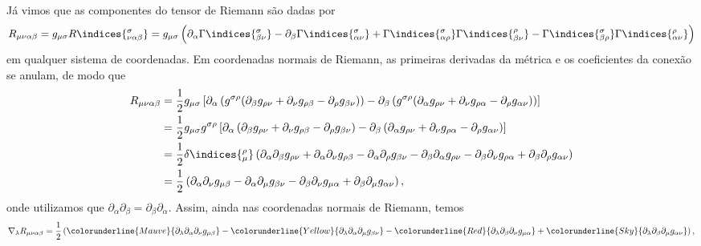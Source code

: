 Já vimos que as componentes do tensor de Riemann são dadas por
\begin{equation*}
    R_{\mu \nu \alpha \beta} = g_{\mu \sigma}R\indices{^\sigma_{\nu \alpha \beta}} = g_{\mu \sigma} \left( \partial_{\alpha}\Gamma\indices{^{\sigma}_{\beta\nu}}- \partial_{\beta}\Gamma\indices{^{\sigma}_{\alpha\nu}} + \Gamma\indices{^\sigma_{\alpha\rho}} \Gamma\indices{^\rho_{\beta\nu}} - \Gamma\indices{^\sigma_{\beta\rho}} \Gamma\indices{^\rho_{\alpha\nu}} \right)
\end{equation*}
em qualquer sistema de coordenadas. Em coordenadas normais de Riemann, as primeiras derivadas da métrica e os coeficientes da conexão se anulam, de modo que
\begin{align*}
    R_{\mu\nu \alpha \beta} &= \frac12g_{\mu \sigma} \left[ \partial_\alpha\left(g^{\sigma \rho}(\partial_\beta g_{\rho \nu} + \partial_\nu g_{\rho \beta} - \partial_{\rho} g_{\beta \nu} )\right) - \partial_\beta\left(g^{\sigma \rho}(\partial_\alpha g_{\rho \nu} + \partial_\nu g_{\rho \alpha} - \partial_{\rho} g_{\alpha \nu} )\right)\right]\\
                            &= \frac12g_{\mu \sigma} g^{\sigma \rho} \left[\partial_\alpha\left(\partial_\beta g_{\rho \nu} + \partial_\nu g_{\rho \beta} - \partial_{\rho} g_{\beta \nu}\right) - \partial_\beta\left(\partial_\alpha g_{\rho \nu} + \partial_\nu g_{\rho \alpha} - \partial_{\rho} g_{\alpha \nu}\right)\right]\\
                            &= \frac12 \delta\indices{^\rho_\mu} \left(\partial_\alpha\partial_\beta g_{\rho \nu} + \partial_\alpha\partial_\nu g_{\rho \beta} - \partial_\alpha\partial_{\rho} g_{\beta \nu} - \partial_\beta\partial_\alpha g_{\rho \nu} - \partial_\beta\partial_\nu g_{\rho \alpha} + \partial_\beta\partial_{\rho} g_{\alpha \nu}\right)\\
                            &= \frac12 \left(\partial_\alpha\partial_\nu g_{\mu \beta} - \partial_\alpha\partial_{\mu} g_{\beta \nu} - \partial_\beta\partial_\nu g_{\mu \alpha} + \partial_\beta\partial_{\mu} g_{\alpha \nu}\right),
\end{align*}
onde utilizamos que \(\partial_\alpha \partial_\beta = \partial_\beta \partial_\alpha\). Assim, ainda nas coordenadas normais de Riemann, temos
\begin{equation*}
    \nabla_{\lambda} R_{\mu\nu \alpha\beta} = \frac12 \left(\colorunderline{Mauve}{\partial_{\lambda}\partial_\alpha\partial_\nu g_{\mu \beta}} - \colorunderline{Yellow}{\partial_\lambda\partial_\alpha\partial_{\mu} g_{\beta \nu}} - \colorunderline{Red}{\partial_\lambda\partial_\beta\partial_\nu g_{\mu \alpha}} + \colorunderline{Sky}{\partial_\lambda\partial_\beta\partial_{\mu} g_{\alpha \nu}}\right),
\end{equation*}
